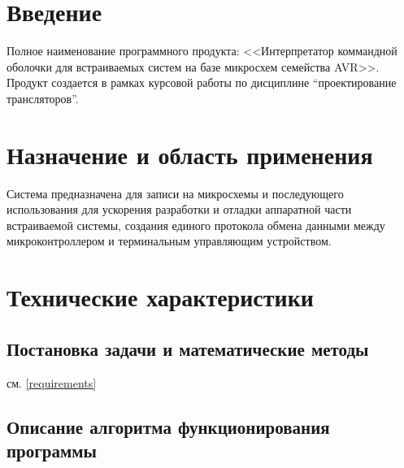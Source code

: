 \documentclass[a4paper, 12pt]{article}
\begin{document}
\section{Введение}

Полное наименование программного продукта: <<Интерпретатор коммандной оболочки для встраиваемых систем на базе 
микросхем семейства AVR>>. Продукт создается в рамках курсовой работы по дисциплине ``проектирование трансляторов''.

\section{Назначение и область применения}

Система предназначена для записи на микросхемы и последующего использования
для ускорения разработки и отладки аппаратной части встраиваемой системы, создания 
единого протокола обмена данными между микроконтроллером и терминальным управляющим
устройством.

\section{Технические характеристики}

\subsection{Постановка задачи и математические методы} %
см. \ref{requirements}

\subsection{Описание алгоритма функционирования программы} %
\end{document}
